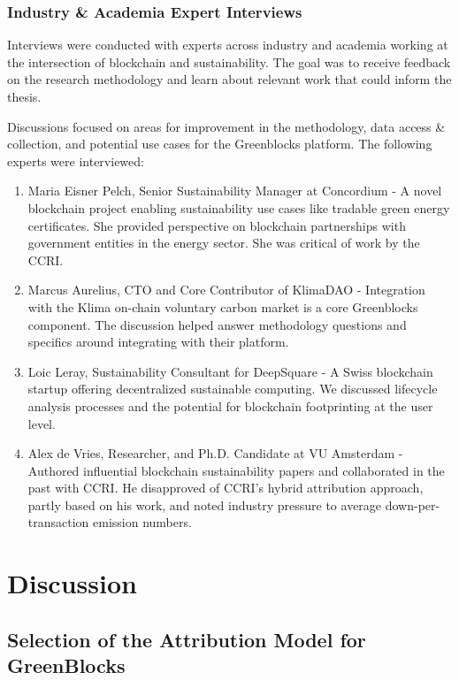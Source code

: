 \documentclass[11pt]{report}
\begin{document}
\subsection{Industry \& Academia Expert Interviews}

Interviews were conducted with experts across industry and academia working at the intersection of blockchain and sustainability. The goal was to receive feedback on the research methodology and learn about relevant work that could inform the thesis.

Discussions focused on areas for improvement in the methodology, data access \& collection, and potential use cases for the Greenblocks platform. The following experts were interviewed:

\begin{enumerate}
    \item Maria Eisner Pelch, Senior Sustainability Manager at Concordium - A novel blockchain project enabling sustainability use cases like tradable green energy certificates. She provided perspective on blockchain partnerships with government entities in the energy sector. She was critical of work by the CCRI.
    \item Marcus Aurelius, CTO and Core Contributor of KlimaDAO - Integration with the Klima on-chain voluntary carbon market is a core Greenblocks component. The discussion helped answer methodology questions and specifics around integrating with their platform.
    \item Loic Leray, Sustainability Consultant for DeepSquare - A Swiss blockchain startup offering decentralized sustainable computing. We discussed lifecycle analysis processes and the potential for blockchain footprinting at the user level.
    \item Alex de Vries, Researcher, and Ph.D. Candidate at VU Amsterdam - Authored influential blockchain sustainability papers and collaborated in the past with CCRI. He disapproved of CCRI's hybrid attribution approach, partly based on his work, and noted industry pressure to average down-per-transaction emission numbers.
\end{enumerate}


\chapter{Discussion}

\section{Selection of the Attribution Model for GreenBlocks}
\end{document}
